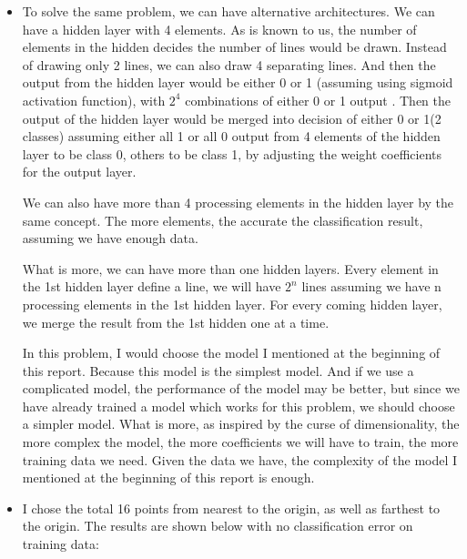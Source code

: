 \documentclass[a4paper]{article}
\begin{document}
\begin{spacing}{2.0}
\begin{itemize}
\item To solve the same problem, we can have alternative architectures. We can have a hidden layer with 4 elements. As is known to us, the number of elements in the hidden decides the number of lines would be drawn. Instead of drawing only 2 lines, we can also draw 4 separating lines. And then the output from the hidden layer would be either 0 or 1 (assuming using sigmoid activation function), with $2^4$ combinations of either 0 or 1 output . Then the output of the hidden layer would be merged into decision of either 0 or 1(2 classes) assuming either all 1 or all 0 output from 4 elements of the hidden layer to be class 0, others to be class 1, by adjusting the weight coefficients for the output layer.

We can also have more than 4 processing elements in the hidden layer by the same concept. The more elements, the accurate the classification result, assuming we have enough data.

What is more, we can have more than one hidden layers. Every element in the 1st hidden layer define a line, we will have $2^n$ lines assuming we have n processing elements in the 1st hidden layer. For every coming hidden layer, we merge the result from the 1st hidden one at a time.

In this problem, I would choose the model I mentioned at the beginning of this report. Because this model is the simplest model. And if we use a complicated model, the performance of the model may be better, but since we have already trained a model which works for this problem, we should choose a simpler model. 
What is more, as inspired by the curse of dimensionality, the more complex the model, the more coefficients we will have to train, the more training data we need. Given the data we have, the complexity of the model I mentioned at the beginning of this report is enough.

\item I chose the total 16 points from nearest to the origin, as well as farthest to the origin. The results are shown below with no classification error on training data:


\end{itemize}
\end{spacing}
\end{document}
